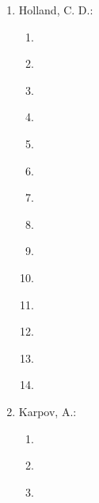 \begin{enumerate}[label=\arabic*.,ref=\arabic*]
\begin{enumerate}[label*=\arabic*.,ref=\theenumi.\arabic*]
        \item \cite{kasprowski2013impact} 
        \item \cite{kapczynski2006modern} 
        \item \cite{kasprowski2013influence} 
        \item \cite{kasprowski2004flick} 
        \item \cite{kasprowski2018fusion} 
        \item \cite{kasprowski2016using}
        \item \cite{harezlak2017eye} 
        \item \cite{kasprowski2016disk} 
        \item \cite{kasprowski212influence}			 
    \end{enumerate}
    \item Holland, C. D.: 
    \begin{enumerate}[label*=\arabic*.,ref=\theenumi.\arabic*]
        \item \cite{holland2011biometric} 
        \item \cite{holland2013complex} 
        \item \cite{komogortsev2012multimodal} 
        \item \cite{holland2012biometric} 
        \item \cite{holland2013complex} 
        \item \cite{komogortsev2015attack} 
        \item \cite{komogortsev2013biometric} 
        \item \cite{komogortsev2014template}
        \item \cite{komogortsev2015biometrics} 
        \item \cite{komogortsev20132d} 
        \item \cite{komogortsev2012cue} 
        \item \cite{komogortsev2014application}
        \item \cite{holland2014software} 
        \item \cite{komogortsev2016oculomotor}			 
    \end{enumerate}
    \item Karpov, A.: 
    \begin{enumerate}[label*=\arabic*.,ref=\theenumi.\arabic*]
        \item \cite{komogortsev2012biometric} 
        \item \cite{kasprowski2012first} 
        \item \cite{komogortsev2012multimodal} 

\end{enumerate}
\end{enumerate}
